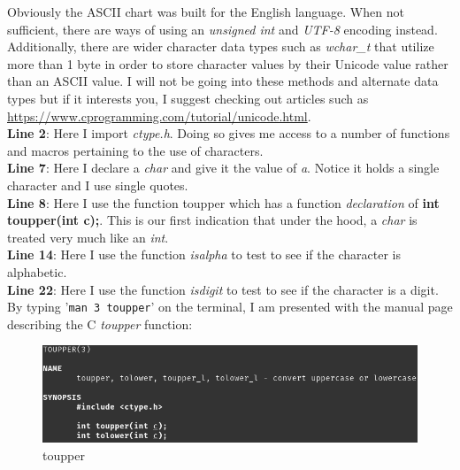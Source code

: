\documentclass[../main.tex]{subfiles}
\begin{document}
	Obviously the ASCII chart was built for the English language.  When not sufficient, there are ways of using an \textit{unsigned int} and \textit{UTF-8} encoding instead.  Additionally, there are wider character data types such as \textit{wchar\_t} that utilize more than 1 byte in order to store character values by their Unicode value rather than an ASCII value.  I will not be going into these methods and alternate data types but if it interests you, I suggest checking out articles such as \href{https://www.cprogramming.com/tutorial/unicode.html}{https://www.cprogramming.com/tutorial/unicode.html}.\\
	
	
	
	\textbf{Line 2}: Here I import \textit{ctype.h}.  Doing so gives me access to a number of functions and macros pertaining to the use of characters.\\
	\textbf{Line 7}: Here I declare a \textit{char} and give it the value of \textit{a}.  Notice it holds a single character and I use single quotes.\\
	\textbf{Line 8}: Here I use the function toupper which has a function \textit{declaration} of \textbf{int toupper(int c);}.  This is our first indication that under the hood, a \textit{char} is treated very much like an \textit{int}.\\
	\textbf{Line 14}: Here I use the function \textit{isalpha} to test to see if the character is alphabetic.\\
	\textbf{Line 22}: Here I use the function \textit{isdigit} to test to see if the character is a digit.\\
	
	By typing '\texttt{man 3 toupper}' on the terminal, I am presented with the manual page describing the C \textit{toupper} function:\\
	
	\begin{figure}[h]
		\centering\includegraphics[scale=0.5]{toupper.png}
		\caption{toupper}
		\label{fig:toupper} %
	\end{figure}
\end{document}
